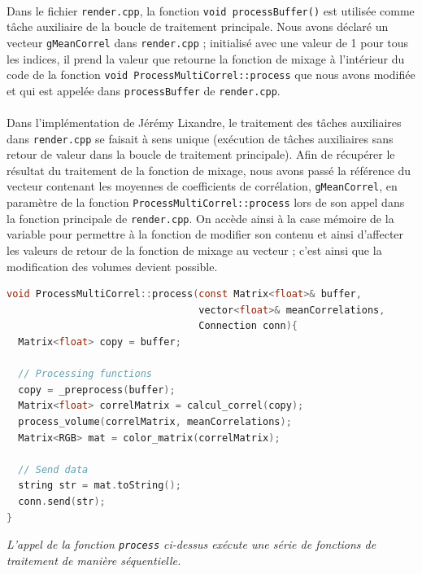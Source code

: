  \paragraph{}
 Dans le fichier \verb!render.cpp!, la fonction
 \verb!void processBuffer()! est utilisée comme tâche auxiliaire de la
 boucle de traitement principale. Nous avons déclaré un vecteur
 \verb!gMeanCorrel! dans \verb!render.cpp! ; initialisé avec une valeur
 de 1 pour tous les indices, il prend la valeur que retourne la
 fonction de mixage à l'intérieur du code de la fonction
 \verb!void ProcessMultiCorrel::process!
 que nous avons modifiée et qui est appelée dans \verb!processBuffer!
 de \verb!render.cpp!.
 \paragraph{}
 Dans l'implémentation de Jérémy Lixandre, le traitement des tâches
 auxiliaires dans \verb!render.cpp! se faisait à sens unique
 (exécution de tâches auxiliaires sans retour de valeur dans la boucle
 de traitement principale). Afin de récupérer le résultat du
 traitement de la fonction de mixage, nous avons passé la référence du
 vecteur contenant les moyennes de coefficients de corrélation,
 \verb!gMeanCorrel!, en paramètre de la fonction
 \verb!ProcessMultiCorrel::process! lors de son appel dans la fonction
 principale de \verb!render.cpp!. On accède ainsi à la case mémoire de
 la variable pour permettre à la fonction de modifier son contenu et
 ainsi d'affecter les valeurs de retour de la fonction de mixage au
 vecteur ; c'est ainsi que la modification des volumes devient
 possible.
 
 \begin{lstlisting}[language=C, frame=single, breaklines=true]
void ProcessMultiCorrel::process(const Matrix<float>& buffer,
                                 vector<float>& meanCorrelations,
                                 Connection conn){
  Matrix<float> copy = buffer;

  // Processing functions
  copy = _preprocess(buffer);
  Matrix<float> correlMatrix = calcul_correl(copy);
  process_volume(correlMatrix, meanCorrelations);
  Matrix<RGB> mat = color_matrix(correlMatrix);

  // Send data
  string str = mat.toString();
  conn.send(str);
}
 \end{lstlisting}
 \begin{center}
  \textit{L'appel de la fonction \verb!process! ci-dessus exécute une série de fonctions de traitement de manière séquentielle.}
 \end{center}
 
